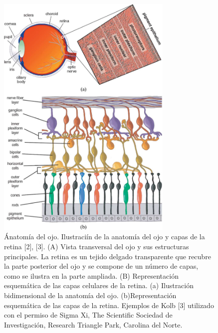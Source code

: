 \begin{figure}[H]
	{
	\centering
	\includegraphics[width=0.75\textwidth]{Figures/ojo}
	\caption[Anatom\'ia del ojo 0-200]{\'Anatom\'ia del ojo. Ilustraci\'in de la anatom\'ia del ojo y capas de la retina [2], [3]. (A) Vista transversal del ojo y sus estructuras principales. La retina es un tejido delgado transparente que recubre la parte posterior del ojo y se compone de un n\'umero de capas, como se ilustra en la parte ampliada. (B) Representaci\'on esquem\'atica de las capas celulares de la retina. (a) Ilustraci\'on bidimensional de la anatom\'ia del ojo. (b)Representaci\'on esquem\'atica de las capas de la retina. Ejemplos de Kolb [3] utilizado con el permiso de Sigma Xi, The Scientific Sociedad de Investigación, Research Triangle Park, Carolina del Norte.}
	\label{fig:AnatomiaDelOjo}
	}
\end{figure}	

